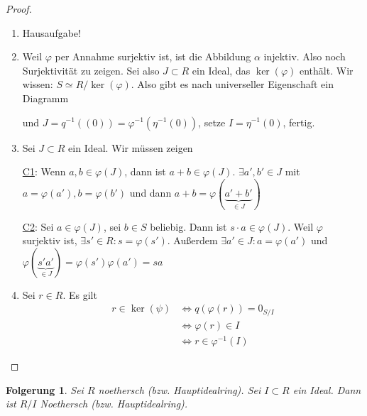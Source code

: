 \documentclass[a4paper,12pt,numbers=noenddot,parskip=full]{scrartcl}
\newcommand{\heading}{\underline}
\theoremstyle{dotless}
\newtheorem{corollary}[theorem]{Folgerung}
\theoremstyle{remark}
\begin{document}
	\begin{proof}
		\begin{enumerate}
			\item Hausaufgabe!
			\item Weil $\varphi$ per Annahme surjektiv ist, ist die Abbildung $\alpha$ injektiv. Also noch Surjektivität zu zeigen. Sei also $J \subset R$ ein Ideal, das $\ker(\varphi)$ enthält. Wir wissen: $S \simeq R/\ker(\varphi)$. Also gibt es nach universeller Eigenschaft ein Diagramm
			\begin{center}
			\end{center}
			und $J = q^{-1}((0)) = \varphi^{-1}(\eta^{-1}(0))$, setze $I = \eta^{-1}(0)$, fertig.
			\item Sei $J \subset R$ ein Ideal. Wir müssen zeigen
			
			\heading{C1}: Wenn $a,b \in \varphi(J)$, dann ist $a + b \in \varphi(J)$. $\exists a', b' \in J$ mit $a =  \varphi(a'), b = \varphi(b')$ und dann $a + b = \varphi(\underbrace{a' + b'}_{\in J})$
			
			\heading{C2}: Sei $a \in \varphi(J)$, sei $b \in S$ beliebig. Dann ist $s \cdot a \in \varphi(J)$. Weil $\varphi$ surjektiv ist, $\exists s' \in R: s = \varphi(s')$. Außerdem $\exists a' \in J: a = \varphi(a')$ und $\varphi(\underbrace{s' a'}_{\in J}) = \varphi(s') \varphi(a') = sa$
			
			\item Sei $r \in R$. Es gilt
			\begin{align*}
				r \in \ker(\psi) &\Leftrightarrow q(\varphi(r)) = 0_{S/I} \\
				&\Leftrightarrow \varphi(r) \in I \\
				&\Leftrightarrow r \in \varphi^{-1}(I)
			\end{align*}
		\end{enumerate}
	\end{proof}

	\begin{corollary}
		Sei $R$ noethersch (bzw. Hauptidealring). Sei $I \subset R$ ein Ideal. Dann ist $R/I$ Noethersch (bzw. Hauptidealring).
	\end{corollary}
\end{document}
